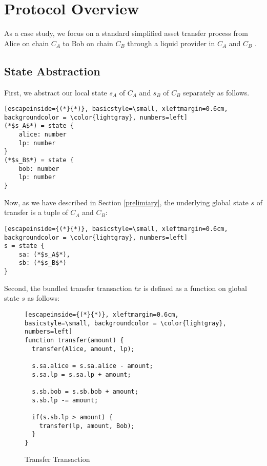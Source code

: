 \section{Protocol Overview}
\label{chp:case-study}
As a case study, we focus on a standard simplified asset transfer process from Alice on chain $C_A$ to Bob on chain $C_B$ through a liquid provider in $C_A$ and $C_B$ \cite{introdefi}. 



\subsection{State Abstraction}
First, 
we abstract our local state $s_A$ of $C_A$ and $s_B$ of $C_B$ separately as follows.

\begin{lstlisting}[escapeinside={(*}{*)}, basicstyle=\small, xleftmargin=0.6cm, backgroundcolor = \color{lightgray}, numbers=left]
(*$s_A$*) = state {
    alice: number
    lp: number
}
(*$s_B$*) = state {
    bob: number
    lp: number
}
\end{lstlisting}

Now, as we have described in Section \ref{prelimiary}, the underlying global state $s$ of transfer is a tuple of $C_A$ and $C_B$:
\begin{lstlisting}[escapeinside={(*}{*)}, basicstyle=\small, xleftmargin=0.6cm, backgroundcolor = \color{lightgray}, numbers=left]
s = state {
    sa: (*$s_A$*),
    sb: (*$s_B$*)
}
\end{lstlisting}

Second, the bundled transfer transaction $tx$ is defined as a function on global state $s$ as follows:

\begin{figure}[!ht]
\begin{lstlisting}[escapeinside={(*}{*)}, xleftmargin=0.6cm, basicstyle=\small, backgroundcolor = \color{lightgray}, numbers=left]
function transfer(amount) {
  transfer(Alice, amount, lp);
  
  s.sa.alice = s.sa.alice - amount;
  s.sa.lp = s.sa.lp + amount;
  
  s.sb.bob = s.sb.bob + amount;
  s.sb.lp -= amount;
  
  if(s.sb.lp > amount) {
    transfer(lp, amount, Bob);
  }
}
\end{lstlisting}
\caption{Transfer Transaction}
\label{fg:transfer}
\end{figure}

